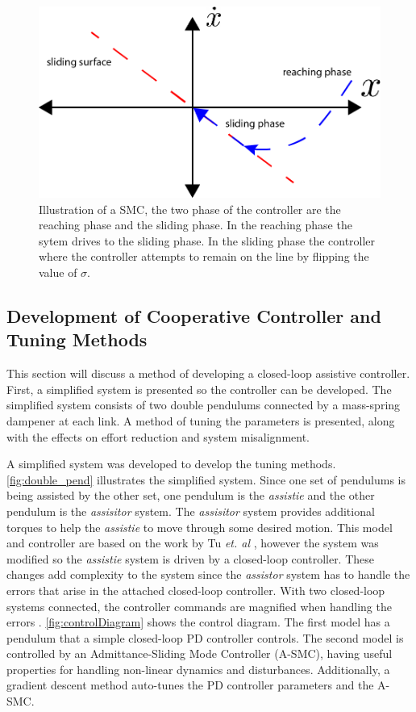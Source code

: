 \begin{figure}
    \centering
    \includegraphics[width=\linewidth]{images/controllers/SMC.png}
    \caption[Illustration of a SMC]{Illustration of a SMC, the two phase of the controller are the reaching phase and the sliding phase. In the reaching phase the sytem drives to the sliding phase. In the sliding phase the controller where the controller attempts to remain on the line by flipping the value of $\sigma$. }
    \label{fig:SMC}
\end{figure}

\subsection{Development of Cooperative Controller and Tuning Methods}

This section will discuss a method of developing a closed-loop assistive controller. First, a simplified system is presented so the controller can be developed. The simplified system consists of two double pendulums connected by a mass-spring dampener at each link. A method of tuning the parameters is presented, along with the effects on effort reduction and system misalignment.

A simplified system was developed to develop the tuning methods. \autoref{fig:double_pend} illustrates the simplified system. Since one set of pendulums is being assisted by the other set, one pendulum is the \textit{assistie} and the other pendulum is the \textit{assisitor} system. The \textit{assisitor} system provides additional torques to help the \textit{assistie} to move through some desired motion. This model and controller are based on the work by Tu \textit{et. al} \cite{tu2020adaptive}, however the system was modified so the \textit{assistie} system is driven by a closed-loop controller. These changes add complexity to the system since the \textit{assistor} system has to handle the errors that arise in the attached closed-loop controller. With two closed-loop systems connected, the controller commands are magnified when handling the errors \cite{tu2020adaptive}. \autoref{fig:controlDiagram} shows the control diagram. The first model has a pendulum that a simple closed-loop PD controller controls. The second model is controlled by an Admittance-Sliding Mode Controller (A-SMC), having useful properties for handling non-linear dynamics and disturbances. Additionally, a gradient descent method auto-tunes the PD controller parameters and the A-SMC. 



